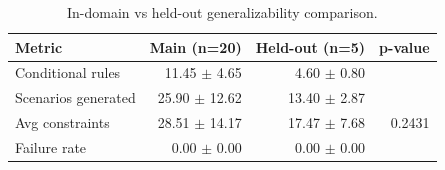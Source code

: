 \begin{table}[htbp]
\centering
\caption{In-domain vs held-out generalizability comparison.}
\label{tab:generalizability}
\begin{tabular}{lrrr}
\toprule
Metric & Main (n=20) & Held-out (n=5) & p-value \\
\midrule
Conditional rules & 11.45 $\pm$ 4.65 & 4.60 $\pm$ 0.80 &  \\
Scenarios generated & 25.90 $\pm$ 12.62 & 13.40 $\pm$ 2.87 &  \\
Avg constraints & 28.51 $\pm$ 14.17 & 17.47 $\pm$ 7.68 & 0.2431 \\
Failure rate & 0.00 $\pm$ 0.00 & 0.00 $\pm$ 0.00 &  \\
\bottomrule
\end{tabular}
\end{table}
